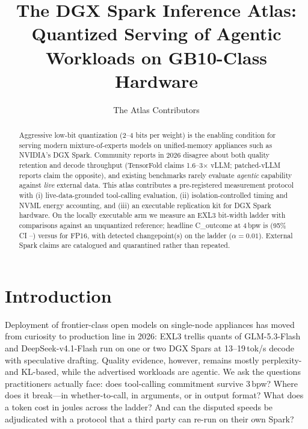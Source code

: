 \documentclass[sigconf, nonacm]{acmart}
\begin{document}
\title{The DGX Spark Inference Atlas: Quantized Serving of Agentic Workloads
on GB10-Class Hardware}

\author{The Atlas Contributors}

\begin{abstract}
Aggressive low-bit quantization (2--4 bits per weight) is the enabling
condition for serving modern mixture-of-experts models on unified-memory
appliances such as NVIDIA's DGX Spark. Community reports in 2026 disagree
about both quality retention and decode throughput (TensorFold claims
1.6--3$\times$ vLLM; patched-vLLM reports claim the opposite), and existing
benchmarks rarely evaluate \emph{agentic} capability against \emph{live}
external data. This atlas contributes a pre-registered measurement protocol
with (i) live-data-grounded tool-calling evaluation, (ii) isolation-controlled
timing and NVML energy accounting, and (iii) an executable replication kit
for DGX Spark hardware. On the locally executable arm we measure an EXL3
bit-width ladder with \atlasMcNemarFamily{} comparisons against an unquantized
reference; headline C\_outcome at 4\,bpw is  (95\% CI
--) versus  for FP16, with
\atlasChangepoints{} detected changepoint(s) on the ladder
($\alpha=0.01$). External Spark claims are catalogued and quarantined
rather than repeated.
\end{abstract}


\maketitle

\section{Introduction}
Deployment of frontier-class open models on single-node appliances has moved
from curiosity to production line in 2026: EXL3 trellis quants of
GLM-5.3-Flash and DeepSeek-v4.1-Flash run on one or two DGX Spars at
13--19\,tok/s decode with speculative drafting. Quality evidence, however,
remains mostly perplexity- and KL-based, while the advertised workloads are
agentic. We ask the questions practitioners actually face: does tool-calling
commitment survive 3\,bpw? Where does it break---in whether-to-call, in
arguments, or in output format? What does a token cost in joules across the
ladder? And can the disputed speeds be adjudicated with a protocol that a
third party can re-run on their own Spark?
\end{document}
